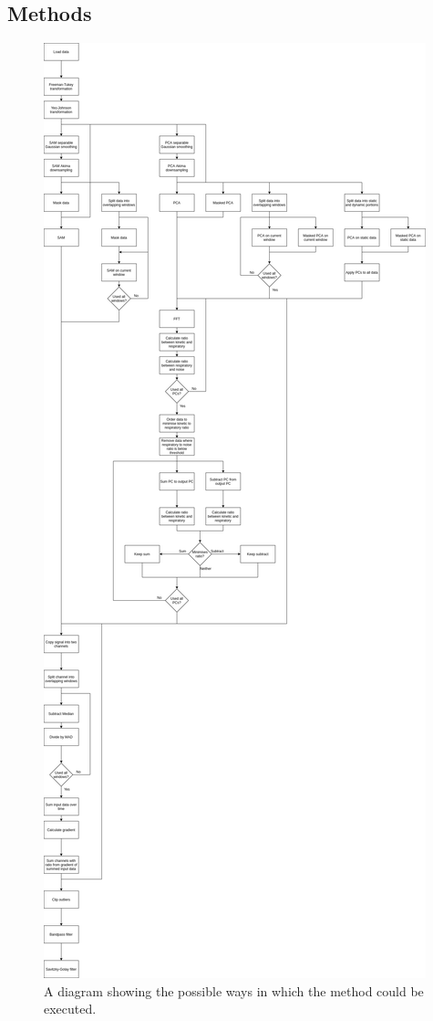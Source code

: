         \subsection{Methods} \label{sec:pca_data_driven_surrogate_signal_extraction_methods_for_dynamic_pet_methods}
            \begin{figure}
                \centering
                
                \includegraphics[width=0.6\linewidth]{figures/data_driven_surrogate_signal_extraction_results_1_flowchart.png}
                
                \captionsetup{singlelinecheck=false, justification=centering}
                \caption{A diagram showing the possible ways in which the method could be executed.}
                \label{fig:pca_data_driven_surrogate_signal_extraction_methods_for_dynamic_pet_methods_flowchart}
            \end{figure}
            
